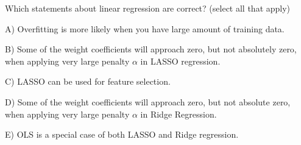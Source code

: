 Which statements about linear regression are correct? (select all that apply)


A) Overfitting is more likely when you have large amount of training data.


B) Some of the weight coefficients will approach zero, but not absolutely zero, when applying very large penalty \ensuremath{\alpha} in LASSO regression.


C) LASSO can be used for feature selection.


D) Some of the weight coefficients will approach zero, but not absolute zero, when applying very large penalty \ensuremath{\alpha} in Ridge Regression.


E) OLS is a special case of both LASSO and Ridge regression.
